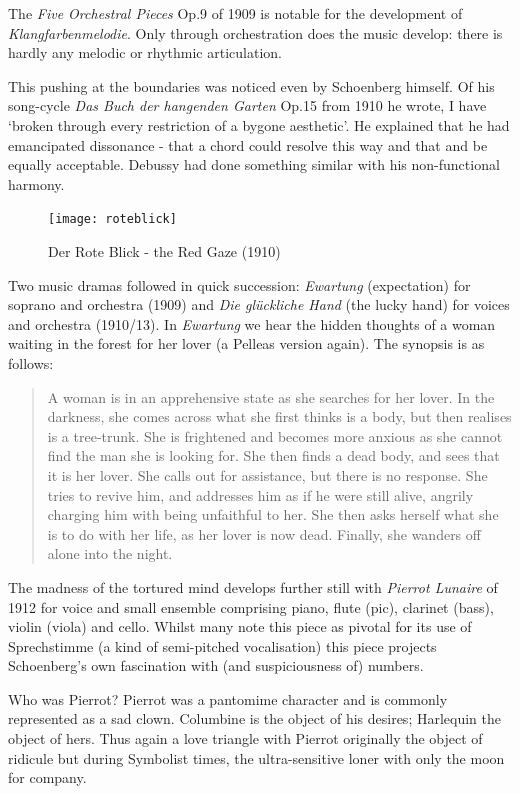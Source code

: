 The \textit{Five Orchestral Pieces} Op.9 of 1909 is notable for the development of \textit{Klangfarbenmelodie}. Only through orchestration does the music develop: there is hardly any melodic or rhythmic articulation. 

This pushing at the boundaries was noticed even by Schoenberg himself. Of his song-cycle \textit{Das Buch der hangenden Garten} Op.15 from 1910 he wrote, I have `broken through every restriction of a bygone aesthetic'. He explained that he had emancipated dissonance - that a chord could resolve this way and that and be equally acceptable. Debussy had done something similar with his non-functional harmony. 

\begin{figure}[H]
\centering
\texttt{[image: roteblick]}\caption{Der Rote Blick - the Red Gaze (1910)}
\label{fig:roteblick}
\end{figure}

Two music dramas followed in quick succession: \textit{Ewartung} (expectation) for soprano and orchestra (1909) and \textit{Die gl\"uckliche Hand} (the lucky hand) for voices and orchestra (1910/13). In \textit{Ewartung} we hear the hidden thoughts of a woman waiting in the forest for her lover (a Pelleas version again). The synopsis is as follows:

\begin{quotation} 
A woman is in an apprehensive state as she searches for her lover. In the darkness, she comes across what she first thinks is a body, but then realises is a tree-trunk. She is frightened and becomes more anxious as she cannot find the man she is looking for. She then finds a dead body, and sees that it is her lover. She calls out for assistance, but there is no response. She tries to revive him, and addresses him as if he were still alive, angrily charging him with being unfaithful to her. She then asks herself what she is to do with her life, as her lover is now dead. Finally, she wanders off alone into the night.
\end{quotation}

The madness of the tortured mind develops further still with \textit{Pierrot Lunaire} of 1912 for voice and small ensemble comprising piano, flute (pic), clarinet (bass), violin (viola) and cello. Whilst many note this piece as pivotal for its use of Sprechstimme (a kind of semi-pitched vocalisation) this piece projects Schoenberg's own fascination with (and suspiciousness of) numbers. 

Who was Pierrot? Pierrot was a pantomime character and is commonly represented as a sad clown. Columbine is the object of his desires; Harlequin the object of hers. Thus again a love triangle with Pierrot originally the object of ridicule but during Symbolist times, the ultra-sensitive loner with only the moon for company.  

